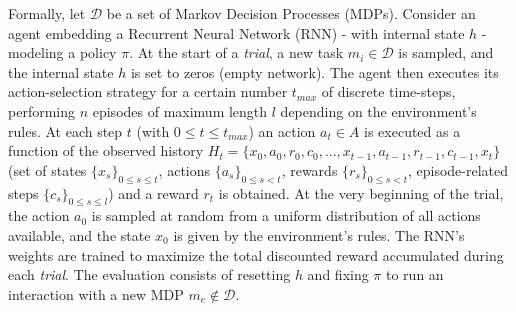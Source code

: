 Formally, let $\mathcal{D}$ be a set of Markov Decision Processes (MDPs). Consider an agent embedding a Recurrent Neural Network (RNN) - with internal state $h$ - modeling a policy $\pi$. At the start of a \textit{trial}, a new task $m_i \in \mathcal{D}$ is sampled, and the internal state $h$ is set to zeros (empty network). The agent then executes its action-selection strategy for a certain number $t_{max}$ of discrete time-steps, performing $n$ episodes of maximum length $l$ depending on the environment's rules. At each step $t$ (with $0 \leq t \leq t_{max}$) an action $a_t \in A$ is executed as a function of the observed history $H_t = \{x_0, a_0, r_0, c_0, . . . , x_{t-1}, a_{t-1}, r_{t-1}, c_{t-1}, x_t\}$ (set of states $\{x_s\}_{0 \leq s \leq t}$, actions $\{a_s\}_{0 \leq s < t}$, rewards $\{r_s\}_{0 \leq s < t}$, episode-related steps $\{c_s\}_{0 \leq s \leq l}$) and a reward $r_t$ is obtained. At the very beginning of the trial, the action $a_0$ is sampled at random from a uniform distribution of all actions available, and the state $x_0$ is given by the environment's rules. The RNN's weights are trained to maximize the total discounted reward accumulated during each \textit{trial}. The evaluation consists of resetting $h$ and fixing $\pi$ to run an interaction with a new MDP $m_e \not\in \mathcal{D}$.

